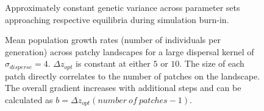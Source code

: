 \begin{figure}[h]
\centering
{}
\caption[~- Approximately constant genetic variance across parameter sets.]{Approximately constant genetic variance across parameter sets approaching respective equilibria during simulation burn-in.}
\label{fig:VaConst}
\end{figure}


\begin{figure}[h]
\centering
{}
\caption[~- Mean population growth rates across patchy landscapes for large dispersal kernel.]{Mean population growth rates (number of individuals per generation) across patchy landscapes for a large dispersal kernel of $\sigma_{disperse} = 4$. $\Delta z_{opt}$ is constant at either $5$ or $10$. The size of each patch directly correlates to the number of patches on the landscape. The overall gradient increases with additional steps and can be calculated as $b = \Delta z_{opt} (number~of~patches - 1)$.}
\label{fig:disp200_multistep}
\end{figure}







